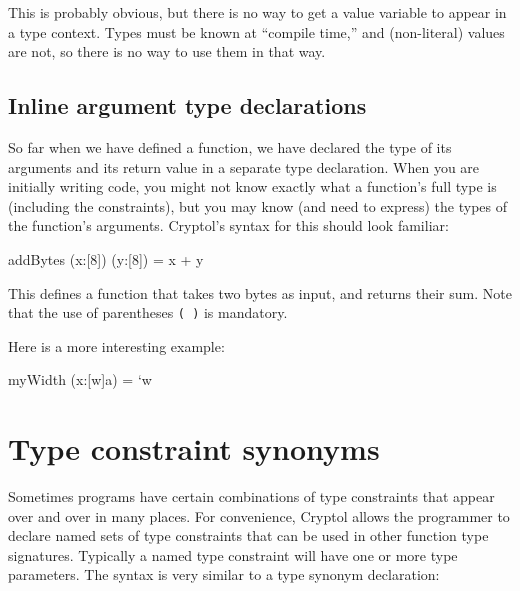 

This is probably obvious, but there is no way to get a value variable
to appear in a type context.  Types must be known at ``compile time,''
and (non-literal) values are not, so there is no way to use them in
that way.


\subsection{Inline argument type declarations}\indTypeInline
\label{sec:inline-argument-type}

So far when we have defined a function, we have declared the type of
its arguments and its return value in a separate type declaration.
When you are initially writing code, you might not know exactly what a
function's full type is (including the constraints), but you may know
(and need to express) the types of the function's arguments. Cryptol's
syntax for this should look familiar:
\begin{code}
  addBytes (x:[8]) (y:[8]) = x + y
\end{code}

This defines a function that takes two bytes as input, and returns their sum.
Note that the use of parentheses \texttt{( )} is mandatory.

Here is a more interesting example:
\begin{code}
  myWidth (x:[w]a) = `w
\end{code}


\section{Type constraint synonyms}

Sometimes programs have certain combinations of type constraints that
appear over and over in many places. For convenience, Cryptol allows
the programmer to declare named sets of type constraints that can be
used in other function type signatures. Typically a named type
constraint will have one or more type parameters. The syntax is very
similar to a type synonym declaration:


